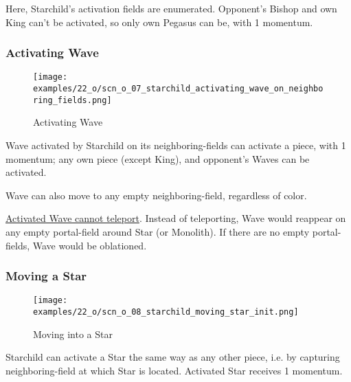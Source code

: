 Here, Starchild’s activation fields are enumerated. Opponent's Bishop and own King can't
be activated, so only own Pegasus can be, with 1 momentum.

\vspace*{-1.1\baselineskip}
\subsubsection*{Activating Wave}

\noindent
\begin{wrapfigure}[8]{l}{0.4\textwidth}
\centering
\texttt{[image: examples/22\_o/scn\_o\_07\_starchild\_activating\_wave\_on\_neighboring\_fields.png]}
\caption{Activating Wave}
\label{fig:scn_o_07_starchild_activating_wave_on_neighboring_fields}
\end{wrapfigure}
Wave activated by Starchild on its neighboring-fields can activate a piece, with 1 momentum;
any own piece (except King), and opponent's Waves can be activated.

Wave can also move to any empty neighboring-field, regardless of color.

\hyperref[fig:scn_o_12_starchild_activated_wave_not_teleporting_init]{Activated Wave cannot teleport}.
Instead of teleporting, Wave would reappear on any empty portal-field around Star (or Monolith).
If there are no empty portal-fields, Wave would be oblationed.

\clearpage %

\subsubsection*{Moving a Star}

\noindent
\begin{wrapfigure}[5]{l}{0.4\textwidth}
\centering
\texttt{[image: examples/22\_o/scn\_o\_08\_starchild\_moving\_star\_init.png]}
\caption{Moving into a Star}
\label{fig:scn_o_08_starchild_moving_star_init}
\end{wrapfigure}
Starchild can activate a Star the same way as any other piece, i.e. by capturing neighboring-field
at which Star is located. Activated Star receives 1 momentum.

